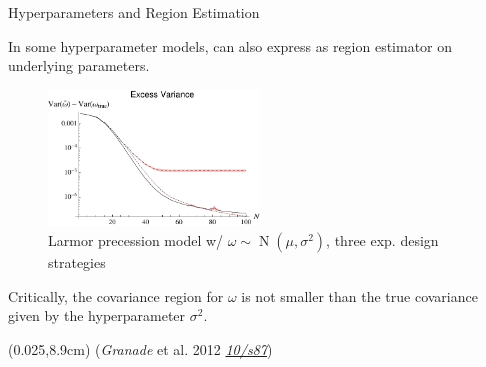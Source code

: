 \documentclass[xcolor=dvipsnames, compress]{beamer}
\renewcommand\UrlFont{\color{red}\rmfamily\itshape}
\newcommand{\shortdoi}[1]{\href{http://doi.org/#1}{\UrlFont 10/#1}}
\newcommand{\N}{\operatorname{N}}
\newcommand{\bottomnote}[1]{
  \begin{textblock*}{0.95\paperwidth} (0.025\paperwidth,8.9cm)
    {\tiny \hfill #1}
  \end{textblock*}
}
\begin{document}
\begin{frame}{Hyperparameters and Region Estimation}

  In some hyperparameter models, can also express as region
  estimator on underlying parameters.

  \begin{figure}
    \centering
    \includegraphics[width=0.5\textwidth]{figures/hypernormal-excess-cov}
    \caption{Larmor precession model w/ $\omega\sim\N(\mu, \sigma^2)$, three exp. design strategies}
  \end{figure}

  Critically, the covariance region for $\omega$ is not smaller
  than the true covariance given by the hyperparameter $\sigma^2$.

  \bottomnote{(\emph{Granade} et al. 2012 \shortdoi{s87})}

\end{frame} 
\end{document}
